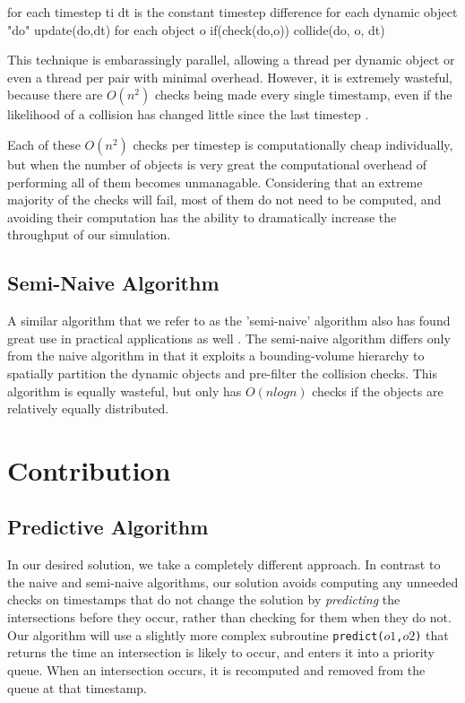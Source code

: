 \documentclass[conference]{IEEEtran}
\begin{document}
\begin{verbatimtab}[3]
for each timestep ti
	dt is the constant timestep difference
	for each dynamic object "do"
		update(do,dt)		
		for each object  o
			if(check(do,o))
				collide(do, o, dt)
\end{verbatimtab}

This technique is embarassingly parallel, allowing a thread per dynamic object or even a thread per pair with minimal overhead.  However, it is extremely
wasteful, because there are $O(n^2)$ checks being made every single timestamp, even if the likelihood of a collision has changed little since the last timestep \cite{Seningood}.  

Each of these $O(n^2)$ checks per timestep is computationally cheap individually, but when the number of objects is very great the computational overhead of performing all of them becomes
unmanagable. Considering that an extreme majority of the checks will fail, most of them do not need to be computed, and avoiding their computation has the ability to dramatically increase the 
throughput of our simulation.

\subsection{Semi-Naive Algorithm}

A similar algorithm that we refer to as the 'semi-naive' algorithm also has found great use in practical applications as well \cite{Bittner02hierarchicaltechniques}.  The semi-naive algorithm differs only from the naive algorithm in that it exploits a bounding-volume hierarchy to spatially partition the dynamic objects and pre-filter the collision checks.  This algorithm is equally wasteful, but only has $O(n log n)$ checks if the objects are relatively equally distributed.

\section{Contribution}
\subsection{Predictive Algorithm}

In our desired solution, we take a completely different approach.  In contrast to the naive and semi-naive algorithms, our solution avoids computing any unneeded checks on timestamps that do not change the solution by \textit{predicting} the intersections before they occur, rather than checking for them when they do not.  Our algorithm will use a slightly more complex subroutine \texttt{predict($o1$,$o2$)} that returns the time an intersection is likely to occur, and enters it into a priority queue.  When an intersection occurs, it is recomputed and removed from the queue at that timestamp.
\end{document}
